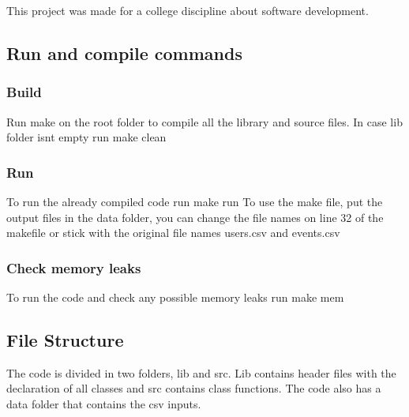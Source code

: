 This project was made for a college discipline about software development.

\subsection*{Run and compile commands}

\subsubsection*{Build}

Run {\ttfamily make} on the root folder to compile all the library and source files. In case lib folder isnt empty run {\ttfamily make clean}

\subsubsection*{Run}

To run the already compiled code run {\ttfamily make run} To use the make file, put the output files in the data folder, you can change the file names on line 32 of the makefile or stick with the original file names \textquotesingle{}users.\+csv\textquotesingle{} and \textquotesingle{}events.\+csv\textquotesingle{}

\subsubsection*{Check memory leaks}

To run the code and check any possible memory leaks run {\ttfamily make mem}

\subsection*{File Structure}

The code is divided in two folders, lib and src. Lib contains header files with the declaration of all classes and src contains class functions. The code also has a data folder that contains the csv inputs. 